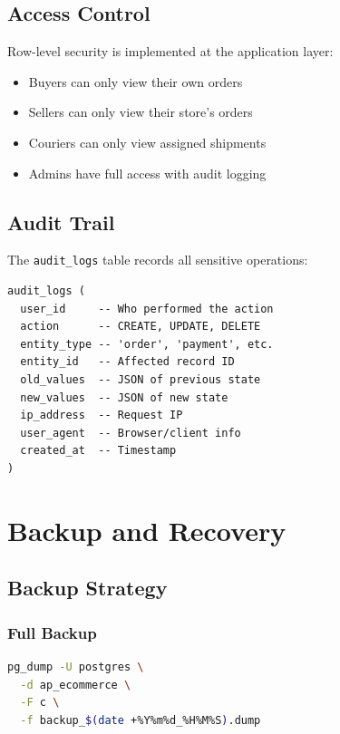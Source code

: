 \documentclass[12pt,a4paper]{report}
\begin{document}
\section{Access Control}

Row-level security is implemented at the application layer:

\begin{itemize}
    \item Buyers can only view their own orders
    \item Sellers can only view their store's orders
    \item Couriers can only view assigned shipments
    \item Admins have full access with audit logging
\end{itemize}

\section{Audit Trail}

The \texttt{audit\_logs} table records all sensitive operations:

\begin{lstlisting}[caption=Audit Log Structure]
audit_logs (
  user_id     -- Who performed the action
  action      -- CREATE, UPDATE, DELETE
  entity_type -- 'order', 'payment', etc.
  entity_id   -- Affected record ID
  old_values  -- JSON of previous state
  new_values  -- JSON of new state
  ip_address  -- Request IP
  user_agent  -- Browser/client info
  created_at  -- Timestamp
)
\end{lstlisting}

\chapter{Backup and Recovery}

\section{Backup Strategy}

\subsection{Full Backup}

\begin{lstlisting}[language=bash, caption=Full Database Backup]
pg_dump -U postgres \
  -d ap_ecommerce \
  -F c \
  -f backup_$(date +%Y%m%d_%H%M%S).dump
\end{lstlisting}
\end{document}
